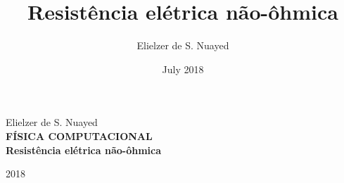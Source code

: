 \documentclass[12pt]{article}
\begin{document}
\begin{titlepage} %
\begin{center} %
{\large Elielzer de S. Nuayed}\\[10cm] %

\bf \huge FÍSICA COMPUTACIONAL\\[0.2cm] %
{\bf \Large Resistência elétrica não-ôhmica}\\[9.5cm]
\end{center} %
\begin{center}
{\large 2018}
\end{center}
\end{titlepage} %

\begin{titlepage} %
\title{Resistência elétrica não-ôhmica}
\author{Elielzer de S. Nuayed }
\date{July 2018}

\end{titlepage} %
\tableofcontents
\maketitle
\end{document}
